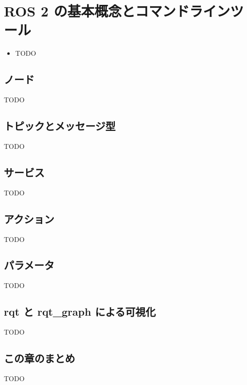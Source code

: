 \chapter{ROS 2 の基本概念とコマンドラインツール}
\label{chap:ros2_concepts}

\begin{goalbox}
  \begin{itemize}
    \item TODO
  \end{itemize}
\end{goalbox}

\section{ノード}

TODO

\section{トピックとメッセージ型}

TODO

\section{サービス}

TODO

\section{アクション}

TODO

\section{パラメータ}

TODO

\section{rqt と rqt\_graph による可視化}

TODO

\section*{この章のまとめ}

TODO

